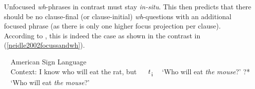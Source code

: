 
\noindent Unfocused \textit{wh}-phrases in contrast must stay \textit{in-situ}. This then predicts that there should be no clause-final (or clause-initial) \textit{wh}-questions with an additional focused phrase (as there is only one higher focus projection per clause). According to \citet[83]{neidle2002language}, this is indeed the case as shown in the contrast in (\ref{neidle2002focussandwh}).

\begin{exe}
\ex\label{neidle2002focussandwh}\begin{xlist}
\sn \textcolor{white}{?*}American Sign Language \citep[83]{neidle2002language}  \\ \textcolor{white}{?*}Context: I know who will eat the rat, but
\ex \textcolor{white}{?*}  $\textrm{\textit{t}}$\textsubscript{i}
\glt \textcolor{white}{?*}`Who will eat \textit{the mouse}?' \label{ex:neidle2002focussandwha}
\ex ?* 
\glt \textcolor{white}{?*}`Who will eat \textit{the mouse}?' \label{ex:neidle2002focussandwhb}
\end{xlist}
\end{exe}



